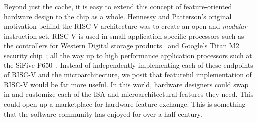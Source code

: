 \documentclass[sigplan,anonymous,review]{acmart}
\begin{document}
Beyond just the cache, it is easy to extend this concept of feature-oriented hardware design to the chip as a whole. Hennessy and Patterson's original motivation behind the RISC-V architecture was to create an open and \textit{modular} instruction set. RISC-V is used in small application specific processors such as the controllers for Western Digital storage products~\cite{} and Google's Titan M2 security chip~\cite{}; all the way up to high performance application processors such at the SiFive P650~\cite{}. Instead of independently implementing each of these endpoints of RISC-V and the microarchitecture, we posit that featureful implementation of RISC-V would be far more useful. In this world, hardware designers could swap in and customize each of the ISA and microarchitectural features they need. This could open up a marketplace for hardware feature exchange. This is something that the software community has enjoyed for over a half century.



\end{document}
